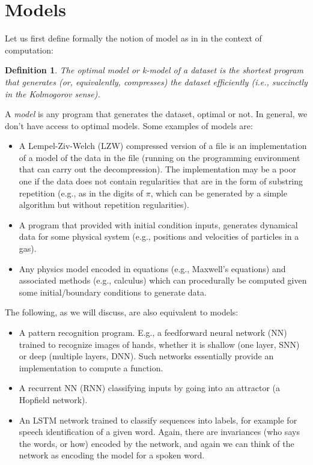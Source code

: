 \documentclass[11pt]{amsart}
\newtheorem{definition}{Definition} %
\begin{document}
\clearpage

\section{Models}

 Let us first define  formally the notion of model  as in \cite{Ruffini:2016ac} in the context of computation: 
\begin{definition}
The optimal model or k-model of a dataset is the shortest program that generates (or, equivalently, compresses) the dataset efficiently (i.e., succinctly in the Kolmogorov sense).
\end{definition}
A {\em model} is any  program that generates the dataset, optimal or not. In general, we don't have access to optimal models. Some examples of models are:
\begin{itemize}
\item A Lempel-Ziv-Welch (LZW) compressed version of a file is an implementation of a model of the data in the file (running on the programming environment that can carry out the decompression). The implementation may be a poor one if the data  does not contain regularities  that are in the form of substring repetition (e.g., as in the digits of $\pi$, which can be generated by a simple algorithm but without repetition regularities).
\item A program that provided with initial condition inputs, generates dynamical data   for some physical system (e.g., positions and velocities of particles in a gas).
\item Any physics model encoded in equations (e.g., Maxwell's equations) and associated methods (e.g., calculus) which can procedurally be computed given some initial/boundary conditions to generate data.
\end{itemize}
The following, as we will discuss, are also equivalent to models:
\begin{itemize}
\item A pattern recognition program. E.g., a feedforward neural network (NN) trained to recognize images of hands, whether it is shallow (one layer, SNN) or deep (multiple layers, DNN). Such networks essentially provide an implementation to compute a function.  %
\item A recurrent NN (RNN) classifying inputs by going into an attractor (a Hopfield network). %
\item An LSTM network trained to classify sequences into labels, for example for speech identification of a given word. Again, there are invariances (who says the words, or how) encoded by the network, and again we can think of the network as encoding the model for a spoken word.  
\end{itemize}
\end{document}
